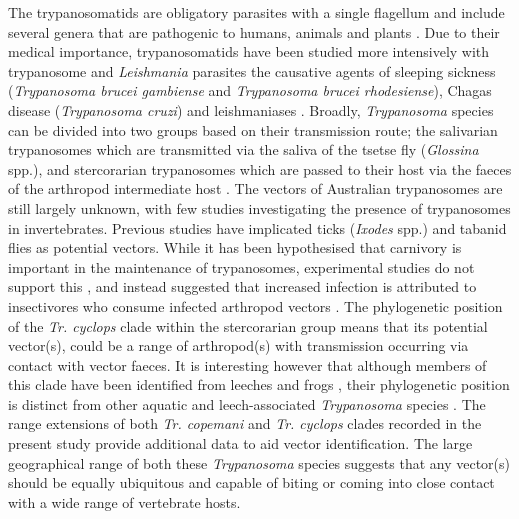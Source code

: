 \documentclass[a4paper, nobind]{templates/ociamthesis}
\begin{document}
The trypanosomatids are obligatory parasites with a single flagellum and include several genera that are pathogenic to humans, animals and plants \autocite{davila-levyExploringEnvironmentalDiversity2015,maslovRecentAdvancesTrypanosomatid2019}. Due to their medical importance, trypanosomatids have been studied more intensively with trypanosome and \emph{Leishmania} parasites the causative agents of sleeping sickness (\emph{Trypanosoma brucei gambiense} and \emph{Trypanosoma brucei rhodesiense}), Chagas disease (\emph{Trypanosoma cruzi}) and leishmaniases \autocite{davila-levyExploringEnvironmentalDiversity2015,lukesTrypanosomatidsAreMuch2018}. Broadly, \emph{Trypanosoma} species can be divided into two groups based on their transmission route; the salivarian trypanosomes which are transmitted via the saliva of the tsetse fly (\emph{Glossina} spp.), and stercorarian trypanosomes which are passed to their host via the faeces of the arthropod intermediate host \autocite{jacksonGenomeEvolutionTrypanosomatid2015}. The vectors of Australian trypanosomes are still largely unknown, with few studies investigating the presence of trypanosomes in invertebrates. Previous studies have implicated ticks (\emph{Ixodes} spp.) \autocite{mackerrasHaematozoaAustralianMammals1959,austenVectorTrypanosomaCopemani2011} and tabanid flies \autocite{boteroMorphologicalPhylogeneticDescription2016} as potential vectors. While it has been hypothesised that carnivory is important in the maintenance of trypanosomes, experimental studies do not support this \autocite{roelligOralTransmissionTrypanosoma2009}, and instead suggested that increased infection is attributed to insectivores who consume infected arthropod vectors \autocite{rochaTrypanosomaCruziInfection2013}. The phylogenetic position of the \emph{Tr. cyclops} clade within the stercorarian group means that its potential vector(s), could be a range of arthropod(s) with transmission occurring via contact with vector faeces. It is interesting however that although members of this clade have been identified from leeches and frogs \autocite{hamiltonNewLineageTrypanosomes2005}, their phylogenetic position is distinct from other aquatic and leech-associated \emph{Trypanosoma} species \autocite{hamiltonTrypanosomesAreMonophyletic2004,hamiltonPatternsCoevolutionTrypanosomes2007,papariniNovelGenotypesTrypanosoma2014,lemosPhylogeneticMorphologicalCharacterization2015}. The range extensions of both \emph{Tr. copemani} and \emph{Tr. cyclops} clades recorded in the present study provide additional data to aid vector identification. The large geographical range of both these \emph{Trypanosoma} species suggests that any vector(s) should be equally ubiquitous and capable of biting or coming into close contact with a wide range of vertebrate hosts.
\end{document}
